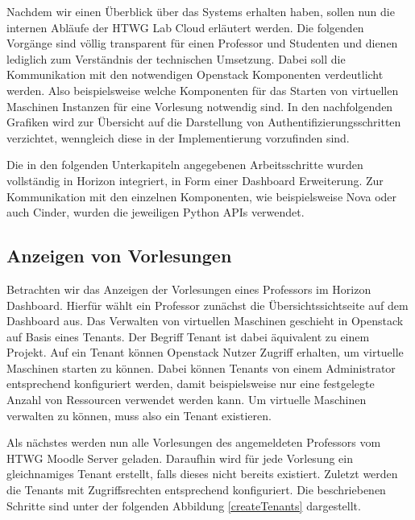 Nachdem wir einen Überblick über das Systems erhalten haben, sollen nun 
die internen Abläufe der HTWG Lab Cloud erläutert werden. Die folgenden
Vorgänge sind völlig transparent für einen Professor und Studenten und dienen lediglich zum
Verständnis der technischen Umsetzung.
Dabei soll die Kommunikation mit den notwendigen Openstack Komponenten verdeutlicht werden.
Also beispielsweise welche Komponenten für das Starten von virtuellen Maschinen Instanzen 
für eine Vorlesung notwendig sind.
In den nachfolgenden Grafiken wird zur Übersicht auf die Darstellung von
Authentifizierungsschritten verzichtet, wenngleich diese in der Implementierung vorzufinden sind.

Die in den folgenden Unterkapiteln angegebenen Arbeitsschritte wurden vollständig in Horizon
integriert, in Form einer Dashboard Erweiterung.
Zur Kommunikation mit den einzelnen Komponenten, wie beispielsweise Nova oder auch Cinder, wurden
die jeweiligen Python APIs verwendet.






\newpage
\subsection{Anzeigen von Vorlesungen}
Betrachten wir das Anzeigen der Vorlesungen eines Professors im Horizon Dashboard.
Hierfür wählt ein Professor zunächst die Übersichtssichtseite auf dem Dashboard aus.
Das Verwalten von virtuellen Maschinen geschieht in Openstack auf Basis eines
Tenants. Der Begriff Tenant ist dabei äquivalent zu einem Projekt. 
Auf ein Tenant können Openstack Nutzer Zugriff erhalten, um virtuelle Maschinen starten
zu können. Dabei können Tenants von einem Administrator entsprechend konfiguriert werden, damit
beispielsweise nur eine festgelegte Anzahl von Ressourcen verwendet werden kann. Um virtuelle 
Maschinen verwalten zu können, muss also ein Tenant existieren.

Als nächstes werden nun alle Vorlesungen des angemeldeten Professors vom HTWG Moodle Server geladen.
Daraufhin wird für jede Vorlesung ein gleichnamiges Tenant erstellt, falls dieses nicht bereits
existiert. Zuletzt werden die Tenants mit Zugriffsrechten entsprechend konfiguriert. 
Die beschriebenen Schritte sind unter der folgenden Abbildung \ref{createTenants} dargestellt.

